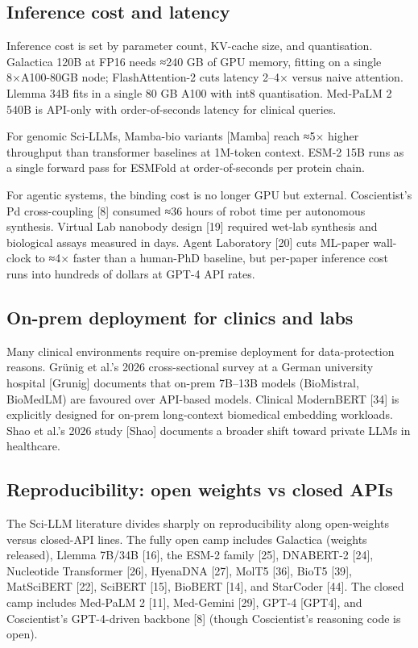 \subsection{Inference cost and latency}\label{inference-cost-and-latency}

Inference cost is set by parameter count, KV-cache size, and quantisation. Galactica 120B at FP16 needs ≈240 GB of GPU memory, fitting on a single 8×A100-80GB node; FlashAttention-2 cuts latency 2--4× versus naive attention. Llemma 34B fits in a single 80 GB A100 with int8 quantisation. Med-PaLM 2 540B is API-only with order-of-seconds latency for clinical queries.

For genomic Sci-LLMs, Mamba-bio variants {[}Mamba{]} reach ≈5× higher throughput than transformer baselines at 1M-token context. ESM-2 15B runs as a single forward pass for ESMFold at order-of-seconds per protein chain.

For agentic systems, the binding cost is no longer GPU but external. Coscientist's Pd cross-coupling {[}8{]} consumed ≈36 hours of robot time per autonomous synthesis. Virtual Lab nanobody design {[}19{]} required wet-lab synthesis and biological assays measured in days. Agent Laboratory {[}20{]} cuts ML-paper wall-clock to ≈4× faster than a human-PhD baseline, but per-paper inference cost runs into hundreds of dollars at GPT-4 API rates.

\subsection{On-prem deployment for clinics and labs}\label{on-prem-deployment-for-clinics-and-labs}

Many clinical environments require on-premise deployment for data-protection reasons. Grünig et al.'s 2026 cross-sectional survey at a German university hospital {[}Grunig{]} documents that on-prem 7B--13B models (BioMistral, BioMedLM) are favoured over API-based models. Clinical ModernBERT {[}34{]} is explicitly designed for on-prem long-context biomedical embedding workloads. Shao et al.'s 2026 study {[}Shao{]} documents a broader shift toward private LLMs in healthcare.

\subsection{Reproducibility: open weights vs closed APIs}\label{reproducibility-open-weights-vs-closed-apis}

The Sci-LLM literature divides sharply on reproducibility along open-weights versus closed-API lines. The fully open camp includes Galactica (weights released), Llemma 7B/34B {[}16{]}, the ESM-2 family {[}25{]}, DNABERT-2 {[}24{]}, Nucleotide Transformer {[}26{]}, HyenaDNA {[}27{]}, MolT5 {[}36{]}, BioT5 {[}39{]}, MatSciBERT {[}22{]}, SciBERT {[}15{]}, BioBERT {[}14{]}, and StarCoder {[}44{]}. The closed camp includes Med-PaLM 2 {[}11{]}, Med-Gemini {[}29{]}, GPT-4 {[}GPT4{]}, and Coscientist's GPT-4-driven backbone {[}8{]} (though Coscientist's reasoning code is open).

